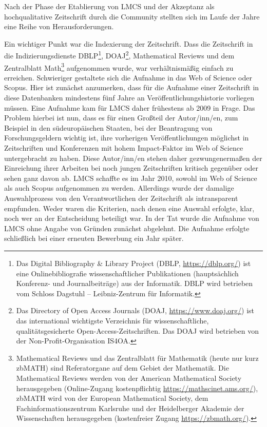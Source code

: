 \documentclass[a4paper,
fontsize=11pt,
oneside,
numbers=noperiodatend,
parskip=half-,
bibliography=totoc,
final
]{scrartcl}
\begin{document}
Nach der Phase der Etablierung von LMCS und der Akzeptanz als
hochqualitative Zeitschrift durch die Community stellten sich im Laufe
der Jahre eine Reihe von Herausforderungen.

Ein wichtiger Punkt war die Indexierung der Zeitschrift. Dass die
Zeitschrift in die Indizierungsdienste DBLP\footnote{Das Digital
  Bibliography \& Library Project (DBLP, \url{https://dblp.org/}) ist
  eine Onlinebibliografie wissenschaftlicher Publikationen
  (hauptsächlich Konferenz- und Journalbeiträge) aus der Informatik.
  DBLP wird betrieben vom Schloss Dagstuhl -- Leibniz-Zentrum für
  Informatik.}, DOAJ\footnote{Das Directory of Open Access Journals
  (DOAJ, \url{https://www.doaj.org/}) ist das international wichtigste
  Verzeichnis für wissenschaftliche, qualitätsgesicherte
  Open-Access-Zeitschriften. Das DOAJ wird betrieben von der
  Non-Profit-Organisation IS4OA.}, Mathematical Reviews und dem
Zentralblatt Math\footnote{Mathematical Reviews und das Zentralblatt für
  Mathematik (heute nur kurz zbMATH) sind Referatorgane auf dem Gebiet
  der Mathematik. Die Mathematical Reviews werden von der American
  Mathematical Society herausgegeben (Online-Zugang kostenpflichtig
  \url{https://mathscinet.ams.org/}), zbMATH wird von der European
  Mathematical Society, dem Fachinformationszentrum Karlsruhe und der
  Heidelberger Akademie der Wissenschaften herausgegeben (kostenfreier
  Zugang \url{https://zbmath.org/}).} aufgenommen wurde, war
verhältnismäßig einfach zu erreichen. Schwieriger gestaltete sich die
Aufnahme in das Web of Science oder Scopus. Hier ist zunächst
anzumerken, dass für die Aufnahme einer Zeitschrift in diese Datenbanken
mindestens fünf Jahre an Veröffentlichungshistorie vorliegen müssen.
Eine Aufnahme kam für LMCS daher frühestens ab 2009 in Frage. Das
Problem hierbei ist nun, dass es für einen Großteil der Autor/inn/en,
zum Beispiel in den südeuropäischen Staaten, bei der Beantragung von
Forschungsgeldern wichtig ist, ihre vorherigen Veröffentlichungen
möglichst in Zeitschriften und Konferenzen mit hohem Impact-Faktor im
Web of Science untergebracht zu haben. Diese Autor/inn/en stehen daher
gezwungenermaßen der Einreichung ihrer Arbeiten bei noch jungen
Zeitschriften kritisch gegenüber oder sehen ganz davon ab. LMCS schaffte
es im Jahr 2010, sowohl im Web of Science als auch Scopus aufgenommen zu
werden. Allerdings wurde der damalige Auswahlprozess von den
Verantwortlichen der Zeitschrift als intransparent empfunden. Weder
waren die Kriterien, nach denen eine Auswahl erfolgte, klar, noch wer an
der Entscheidung beteiligt war. In der Tat wurde die Aufnahme von LMCS
ohne Angabe von Gründen zunächst abgelehnt. Die Aufnahme erfolgte
schließlich bei einer erneuten Bewerbung ein Jahr später.
\end{document}
